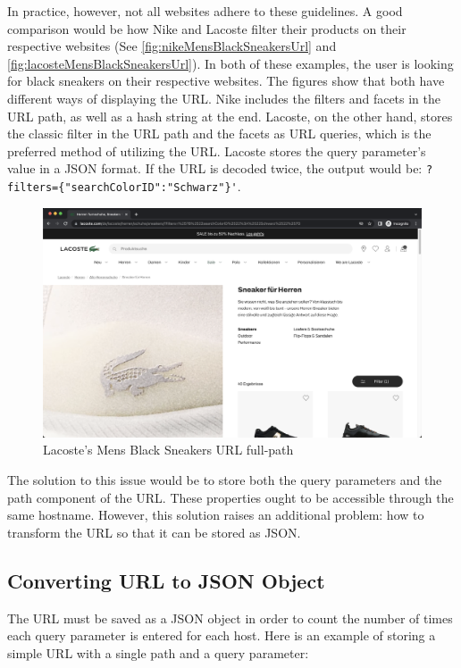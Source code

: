 In practice, however, not all websites adhere to these guidelines. A good comparison would be how Nike and Lacoste filter their products on their respective websites (See \autoref{fig:nikeMensBlackSneakersUrl} and \autoref{fig:lacosteMensBlackSneakersUrl}). In both of these examples, the user is looking for black sneakers on their respective websites. The figures show that both have different ways of displaying the URL. Nike includes the filters and facets in the URL path, as well as a hash string at the end. Lacoste, on the other hand, stores the classic filter in the URL path and the facets as URL queries, which is the preferred method of utilizing the URL. Lacoste stores the query parameter's value in a JSON format. If the URL is decoded twice, the output would be: \verb;?filters={"searchColorID":"Schwarz"}';.

\begin{figure}[H]
  \includegraphics[width=\textwidth]{assets/screenshot_lacoste_website.png}
  \caption{Lacoste's Mens Black Sneakers URL full-path}
  \label{fig:lacosteMensBlackSneakersUrl}
\end{figure}

The solution to this issue would be to store both the query parameters and the path component of the URL. These properties ought to be accessible through the same hostname. However, this solution raises an additional problem: how to transform the URL so that it can be stored as JSON.

\subsection*{Converting URL to JSON Object}
The URL must be saved as a JSON object in order to count the number of times each query parameter is entered for each host. Here is an example of storing a simple URL with a single path and a query parameter:

